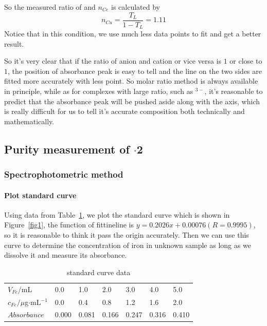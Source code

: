 So the measured ratio of  and  $n_{Ce}$ is calculated by$$n_{Cu}=\frac{T_L}{1-T_L}=1.11$$Notice that in this condition, we use much less data points to fit and get a better result.

So it's very clear that if the ratio of anion and cation or vice versa is $1$ or close to $1$, the position of absorbance peak is easy to tell and the line on the two sides are fitted more accurately with less point. So molar ratio method is always available in principle, while as for complexes with large ratio, such as \ce{[Fe(CN)6]}$^{3-}$, it's reasonable to predict that the absorbance peak will be pushed aside along with the axis, which is really difficult for us to tell it's accurate composition both technically and mathematically.


\subsection{Purity measurement of $\cdot$2}

\subsubsection{Spectrophotometric method}

\paragraph{Plot standard curve}
Using data from Table~\ref{tab.Cal}, we plot the standard curve which is shown in Figure~\ref{fig1}, the function of fittineline is $y=0.2026x+0.00076(R=0.9995)$, so it is reasonable to think it pass the origin accurately. Then we can use this curve to determine the concentration of iron in unknown sample as long as we dissolve it and measure its absorbance.
\begin{table}[H]
	\caption{standard curve data}
	\label{tab.Cal}
	\begin{tabular}{lllllll}
	\toprule
	$V_{Fe}$/mL    & 0.0 & 1.0 & 2.0 & 3.0 & 4.0 & 5.0 \\
	$c_{Fe}/\mu$g$\cdot$mL$^{-1}$
				   & 0.0 & 0.4 & 0.8 & 1.2 & 1.6 & 2.0 \\
	\midrule
	$Absorbance$     &0.000&0.081&0.166&0.247&0.316&0.410\\
	\bottomrule
	\end{tabular}
\end{table}


